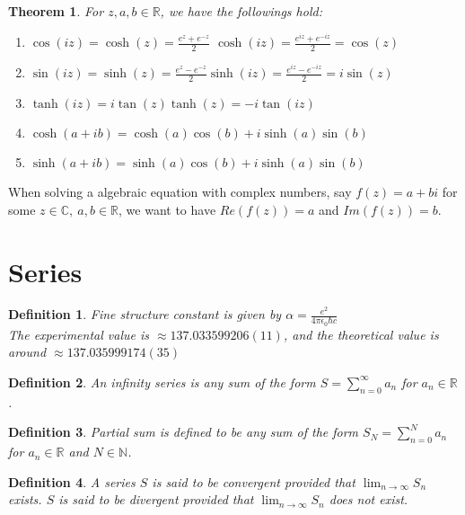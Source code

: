 \documentclass[11pt]{article}
\theoremstyle{break}
\theoremstyle{break}
\newtheorem{thm}{Theorem}[section]
\newtheorem{defn}{Definition}[corL]
\newcommand{\R}{\mathbb{R}}
\newcommand{\N}{\mathbb{N}}
\newcommand{\Complex}{\mathbb{C}}
\begin{document}
\begin{thm}
For $z,a,b \in \R$, we have the followings hold:
\begin{enumerate}[topsep=3pt,itemsep=-1ex,partopsep=1ex,parsep=1ex]
\item $\cos (iz) = \cosh (z) = \frac{e^z+e^{-z}}{2}$ \hfill $\cosh(iz) = \frac{e^{iz}+e^{-iz}}{2} = \cos (z)$
\item $\sin (iz) = \sinh (z) = \frac{e^z - e^{-z}}{2}$\hfill $\sinh(iz) = \frac{e^{iz}-e^{-iz}}{2} = i\sin(z)$
\item $\tanh(iz) = i\tan(z) $\hfill $\tanh(z) = -i\tan(iz)$
\item $\cosh(a+ib) = \cosh(a)\cos(b)+i\sinh(a)\sin(b)$
\item $\sinh(a+ib) = \sinh(a)\cos(b)+i\sinh(a)\sin(b)$
\end{enumerate}
\end{thm}

When solving a algebraic equation with complex numbers, say $f(z) = a+bi$ for some $z \in\Complex,\ a,b\in \R$, we want to have $Re(f(z)) = a$ and $Im(f(z)) = b$.\\
\newpage

\section{\color{red} Series}

\begin{defn}
Fine structure constant is given by $\alpha = \frac{e^2}{4\pi \epsilon_0 \hbar c}$\\ The experimental value is $\approx 137.033599206(11)$, and the theoretical value is around $\approx 137.035999174(35)$
\end{defn}

\begin{defn}
An infinity series is any sum of the form $S = \sum_{n=0}^\infty a_n$ for $a_n \in \R$.
\end{defn}

\begin{defn}
Partial sum is defined to be any sum of the form $S_N = \sum_{n=0}^N a_n$ for $a_n \in \R$ and $N \in \N$.
\end{defn}

\begin{defn}
A series $S$ is said to be convergent provided that $\lim_{n \to \infty} S_n$ exists. $S$ is said to be divergent provided that $\lim_{n\to \infty} S_n$ does not exist.
\end{defn}
\end{document}
